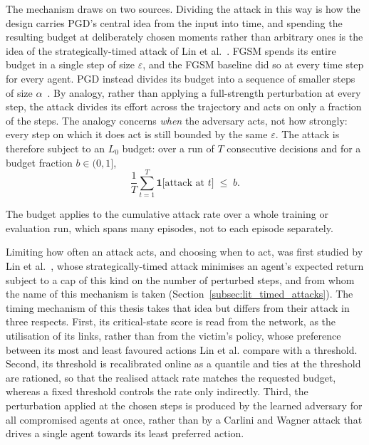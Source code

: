 The mechanism draws on two sources. Dividing the attack in this way is how the design
carries PGD's central idea from the input into time, and spending the resulting budget at
deliberately chosen moments rather than arbitrary ones is the idea of the
strategically-timed attack of Lin et al.~\cite{lin2019tacticsadversarialattackdeep}.
FGSM spends its entire budget in a single step of size
$\varepsilon$, and the FGSM baseline did so at every time step for every agent. PGD
instead divides its budget into a sequence of smaller steps of size
$\alpha$~\cite{madry2019deeplearningmodelsresistant}. By analogy, rather than applying a
full-strength perturbation at every step, the attack divides its effort across the
trajectory and acts on only a fraction of the steps. The analogy concerns \emph{when} the
adversary acts, not how strongly: every step on which it does act is still bounded by
the same $\varepsilon$. The attack is therefore subject to an $L_0$ budget: over a run
of $T$ consecutive decisions and for a budget fraction $b \in (0,1]$,
\begin{equation}
  \frac{1}{T} \sum_{t=1}^{T} \mathbf{1}\big[\text{attack at } t\big]
  \;\le\; b .
  \label{eq:l0_budget}
\end{equation}

\noindent The budget applies to the cumulative attack rate over a whole training or
evaluation run, which spans many episodes, not to each episode separately.

Limiting how often an attack acts, and choosing when to act, was first studied by Lin et
al.~\cite{lin2019tacticsadversarialattackdeep}, whose strategically-timed attack minimises
an agent's expected return subject to a cap of this kind on the number of perturbed
steps, and from whom the name of this mechanism is taken
(Section~\ref{subsec:lit_timed_attacks}). The timing mechanism of this thesis takes that
idea but differs from their attack in three respects. First, its critical-state
score is read from the network, as the utilisation of its links, rather than from the
victim's policy, whose preference between its most and least favoured actions Lin et al.
compare with a threshold. Second, its threshold is recalibrated online as a quantile and
ties at the threshold are rationed, so that the realised attack rate matches the
requested budget, whereas a fixed threshold controls the rate only indirectly. Third, the
perturbation applied at the chosen steps is produced by the learned adversary for all
compromised agents at once, rather than by a Carlini and Wagner attack that drives a
single agent towards its least preferred action.

